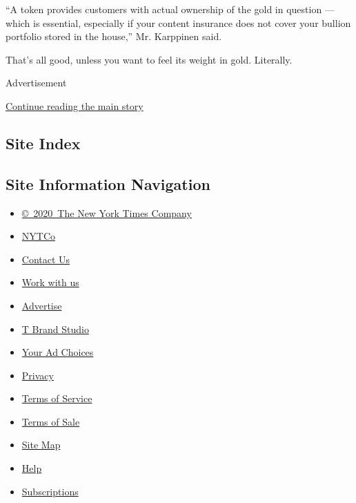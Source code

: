 ``A token provides customers with actual ownership of the gold in
question --- which is essential, especially if your content insurance
does not cover your bullion portfolio stored in the house,'' Mr.
Karppinen said.

That's all good, unless you want to feel its weight in gold. Literally.

Advertisement

\protect\hyperlink{after-bottom}{Continue reading the main story}

\hypertarget{site-index}{%
\subsection{Site Index}\label{site-index}}

\hypertarget{site-information-navigation}{%
\subsection{Site Information
Navigation}\label{site-information-navigation}}

\begin{itemize}
\tightlist
\item
  \href{https://help.nytimes.com/hc/en-us/articles/115014792127-Copyright-notice}{©~2020~The
  New York Times Company}
\end{itemize}

\begin{itemize}
\tightlist
\item
  \href{https://www.nytco.com/}{NYTCo}
\item
  \href{https://help.nytimes.com/hc/en-us/articles/115015385887-Contact-Us}{Contact
  Us}
\item
  \href{https://www.nytco.com/careers/}{Work with us}
\item
  \href{https://nytmediakit.com/}{Advertise}
\item
  \href{http://www.tbrandstudio.com/}{T Brand Studio}
\item
  \href{https://www.nytimes.com/privacy/cookie-policy\#how-do-i-manage-trackers}{Your
  Ad Choices}
\item
  \href{https://www.nytimes.com/privacy}{Privacy}
\item
  \href{https://help.nytimes.com/hc/en-us/articles/115014893428-Terms-of-service}{Terms
  of Service}
\item
  \href{https://help.nytimes.com/hc/en-us/articles/115014893968-Terms-of-sale}{Terms
  of Sale}
\item
  \href{https://spiderbites.nytimes.com}{Site Map}
\item
  \href{https://help.nytimes.com/hc/en-us}{Help}
\item
  \href{https://www.nytimes.com/subscription?campaignId=37WXW}{Subscriptions}
\end{itemize}
